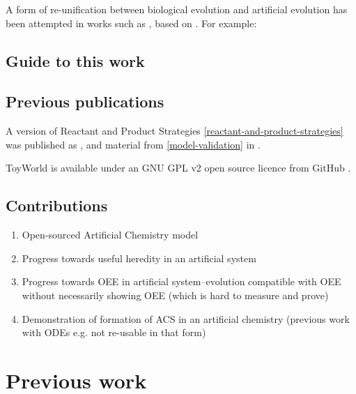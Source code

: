 A form of re-unification between biological evolution and artificial evolution has been attempted in works such as \parencite{Paixao2015}, based on . For example: 



\section{Guide to this work}

\section{Previous publications}\label{previous-publications}

A version of Reactant and Product Strategies \cref{reactant-and-product-strategies} was published as \cite{Young2015},
and material from \cref{model-validation} in \cite{Young2013}.

ToyWorld is available under an GNU GPL v2 open source licence from GitHub \cite{toyworld}.

\section{Contributions}\label{contributions}

\begin{enumerate}
	\item
	Open-sourced Artificial Chemistry model
	\item
	Progress towards useful heredity in an artificial system
	\item
	Progress towards OEE in artificial system--evolution compatible with
	OEE without necessarily showing OEE (which is hard to measure and
	prove)
	\item
	Demonstration of formation of ACS in an artificial chemistry (previous
	work with ODEs e.g. \parencite{Hurndall2014} not re-usable in that form)
\end{enumerate}
\chapter{Previous work}\label{previous-work}

